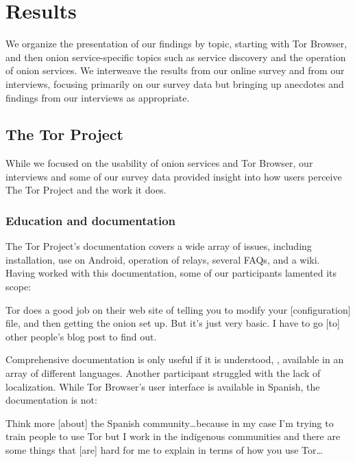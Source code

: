\section{Results}
\label{sec:results}

We organize the presentation of our findings by topic, starting with Tor
Browser, and then onion service-specific topics such as service discovery and
the operation of onion services.  We interweave the results from our online
survey and from our interviews, focusing primarily on our survey data but
bringing up anecdotes and findings from our interviews as appropriate.

\subsection{The Tor Project}

While we focused on the usability of onion services and Tor Browser, our
interviews and some of our survey data provided insight into how users perceive
The Tor Project and the work it does.

\subsubsection{Education and documentation}

The Tor Project's documentation covers a wide array of issues, including
installation, use on Android, operation of relays, several FAQs, and a wiki.
Having worked with this documentation, some of our participants lamented its
scope:

\begin{displayquote}[P14]
Tor does a good job on their web site of telling you to modify your
[configuration] file, and then getting the onion set up.  But it's just very
basic.  I have to go [to] other people's blog post to find out.
\end{displayquote}

Comprehensive documentation is only useful if it is understood, \ie, available
in an array of different languages.  Another participant struggled with the lack
of localization.  While Tor Browser's user interface is available in Spanish,
the documentation is not:

\begin{displayquote}[P11]
Think more [about] the Spanish community\dots because in my case I'm trying to
train people to use Tor but I work in the indigenous communities and there are
some things that [are] hard for me to explain in terms of how you use Tor\dots
\end{displayquote}

